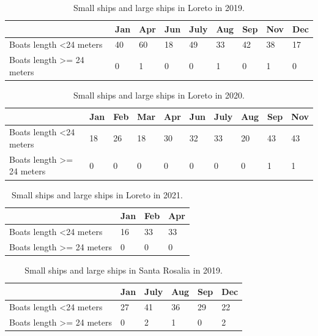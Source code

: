 \begin{table}[h!]
\begin{tabular}{|l|l|l|l|l|l|l|l|l|}
\hline
                                       & Jan & Apr & Jun & July & Aug & Sep & Nov & Dec \\ \hline
Boats length \textless 24 meters       & 40  & 60  & 18  & 49   & 33  & 42  & 38  & 17  \\ \hline
Boats length \textgreater{}= 24 meters & 0   & 1   & 0   & 0    & 1   & 0   & 1   & 0   \\ \hline
\end{tabular}
\caption{Small ships and large ships in Loreto in 2019.}
\end{table}


\begin{table}[h!]
\begin{tabular}{|l|l|l|l|l|l|l|l|l|l|}
\hline
                                       & Jan & Feb & Mar & Apr & Jun & July & Aug & Sep & Nov \\ \hline
Boats length \textless 24 meters       & 18  & 26  & 18  & 30  & 32  & 33   & 20  & 43  & 43  \\ \hline
Boats length \textgreater{}= 24 meters & 0   & 0   & 0   & 0   & 0   & 0    & 0   & 1   & 1   \\ \hline
\end{tabular}
\caption{Small ships and large ships in Loreto in 2020.}
\end{table}



\begin{table}[h!]
\begin{tabular}{|l|l|l|l|}
\hline
                                       & Jan & Feb & Apr \\ \hline
Boats length \textless 24 meters       & 16  & 33  & 33  \\ \hline
Boats length \textgreater{}= 24 meters & 0   & 0   & 0   \\ \hline
\end{tabular}
\caption{Small ships and large ships in Loreto in 2021.}
\end{table}


\begin{table}[h!]
\begin{tabular}{|l|l|l|l|l|l|}
\hline
                                       & Jan & July & Aug & Sep & Dec \\ \hline
Boats length \textless 24 meters       & 27  & 41   & 36  & 29  & 22  \\ \hline
Boats length \textgreater{}= 24 meters & 0   & 2    & 1   & 0   & 2   \\ \hline
\end{tabular}
\caption{Small ships and large ships in Santa Rosalia in 2019.}
\end{table}


